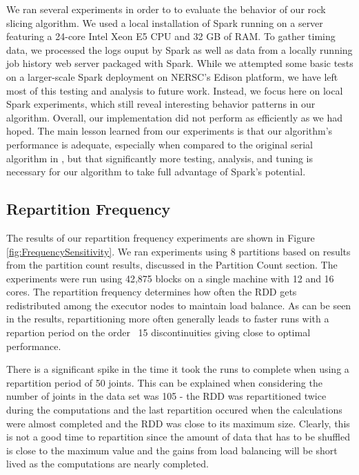 We ran several experiments in order to to evaluate the behavior of our rock slicing algorithm. We used a local installation of Spark running on a server featuring a 24-core Intel Xeon E5 CPU and 32 GB of RAM. To gather timing data, we processed the logs ouput by Spark as well as data from a locally running job history web server packaged with Spark. While we attempted some basic tests on a larger-scale Spark deployment on NERSC's Edison platform, we have left most of this testing and analysis to future work. Instead, we focus here on local Spark experiments, which still reveal interesting behavior patterns in our algorithm. Overall, our implementation did not perform as efficiently as we had hoped. The main lesson learned from our experiments is that our algorithm's performance is adequate, especially when compared to the original serial algorithm in \cite{slicing}, but that significantly more testing, analysis, and tuning is necessary for our algorithm to take full advantage of Spark's potential.

\subsection{Repartition Frequency}
The results of our repartition frequency experiments are shown in Figure \ref{fig:FrequencySensitivity}. We ran experiments using 8 partitions based on results from the partition count results, discussed in the Partition Count section. The experiments were run using 42,875 blocks on a single machine with 12 and 16 cores. The repartition frequency determines how often the RDD gets redistributed among the executor nodes to maintain load balance. As can be seen in the results, repartitioning more often generally leads to faster runs with a repartion period on the order ~15 discontinuities giving close to optimal performance. \par

There is a significant spike in the time it took the runs to complete when using a repartition period of 50 joints. This can be explained when considering the number of joints in the data set was 105 - the RDD was repartitioned twice during the computations and the last repartition occured when the calculations were almost completed and the RDD was close to its maximum size. Clearly, this is not a good time to repartition since the amount of data that has to be shuffled is close to the maximum value and the gains from load balancing will be short lived as the computations are nearly completed. \par

